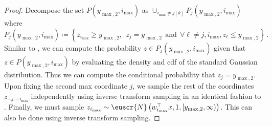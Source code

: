 \documentclass[11pt,letterpaper]{article}
\theoremstyle{plain}
\theoremstyle{definition}
\theoremstyle{remark}
\newcommand{\inbrace}[1]{\ensuremath{\left\{#1\right\}}}
\newcommand{\inparen}[1]{\ensuremath{\left(#1\right)}}
\newcommand{\customcal}[1]{\euscr{#1}}
\newcommand{\cN}{\customcal{N}}
\newcommand{\truncatedNormal}[3]{\cN\inparen{#1,#2,#3}}
\newcommand{\smax}{\max,2} %
\newcommand{\imax}{i_{\max}}
\newcommand{\ysmax}{y_{\smax}}
\begin{document}
{{\begin{proof}
        Decompose the set $P(\ysmax, \imax)$ as
        $
            \cup_{\imax\neq j [k]} P_{j}(\ysmax, \imax)
        $
        where
        \[
            P_{j}(\ysmax, \imax) \coloneqq \inbrace{
                z_{\imax}\geq \ysmax,~~z_j=\ysmax~~\text{and}~~\forall \ell\neq j, \imax, z_\ell\leq \ysmax
            }\,.
        \]
        Similar to ,
        we can compute the probability $z\in P_j(\ysmax, \imax)$ given that $z\in P(\ysmax, \imax)$
        by evaluating the density and cdf of the standard Gaussian distribution.
        Thus we can compute the conditional probability that $z_j = \ysmax$.
        Upon fixing the second max coordinate $j$,
        we sample the rest of the coordinates $z_{-j, -\imax}$ independently using inverse transform sampling
        in an identical fashion to .
        Finally,
        we must sample $z_{\imax}\sim \truncatedNormal{w_{\imax}^\top x}{1}{[\ysmax, \infty)}$.
        This can also be done using inverse transform sampling.
    \end{proof}

}}
\end{document}
